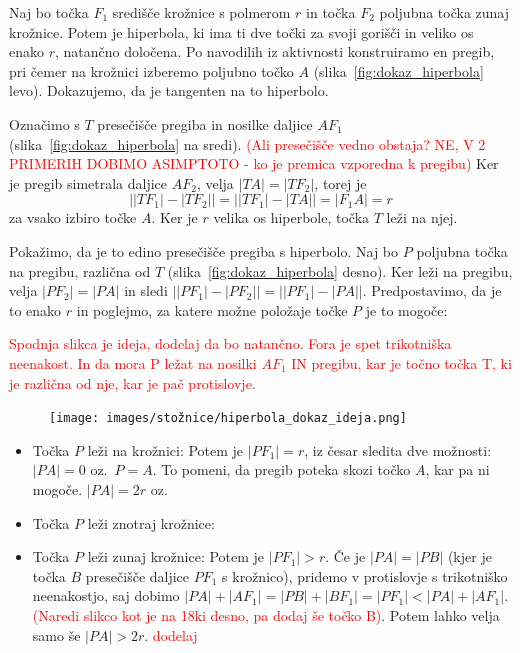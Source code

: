\begin{dokaz}
    Naj bo točka $F_1$ središče krožnice s polmerom $r$ in točka $F_2$ poljubna točka zunaj krožnice. Potem je hiperbola, ki ima ti dve točki za svoji gorišči in veliko os enako $r$, natančno določena. Po navodilih iz aktivnosti konstruiramo en pregib, pri čemer na krožnici izberemo poljubno točko $A$ (slika~\ref{fig:dokaz_hiperbola} levo). Dokazujemo, da je tangenten na to hiperbolo.

    Označimo s $T$ presečišče pregiba in nosilke daljice $AF_1$ (slika~\ref{fig:dokaz_hiperbola} na sredi). \textcolor{red}{(Ali presečišče vedno obstaja? NE, V 2 PRIMERIH DOBIMO ASIMPTOTO - ko je premica vzporedna k pregibu)} Ker je pregib simetrala daljice $AF_2$, velja $|TA| = |TF_2|$, torej je 
    $$\left||TF_1| - |TF_2|\right| = \left||TF_1| - |TA|\right| = |F_1A| = r$$
    za vsako izbiro točke $A$. Ker je $r$ velika os hiperbole, točka $T$ leži na njej.

    Pokažimo, da je to edino presečišče pregiba s hiperbolo. Naj bo $P$ poljubna točka na pregibu, različna od $T$ (slika~\ref{fig:dokaz_hiperbola} desno). Ker leži na pregibu, velja $|PF_2| = |PA|$ in sledi $\left||PF_1| - |PF_2|\right| = \left||PF_1| - |PA|\right|$. Predpostavimo, da je to enako $r$ in poglejmo, za katere možne položaje točke $P$ je to mogoče:

    \textcolor{red}{Spodnja slikca je ideja, dodelaj da bo natančno. Fora je spet trikotniška neenakost. In da mora P ležat na nosilki $AF_1$ IN pregibu, kar je točno točka T, ki je različna od nje, kar je pač protislovje.}

    \begin{figure}[h]
        \centering
        \texttt{[image: images/stožnice/hiperbola\_dokaz\_ideja.png]}
    \end{figure}

    \begin{itemize}
        \item Točka $P$ leži na krožnici: Potem je $|PF_1| = r$, iz česar sledita dve možnosti:
            \subitem $|PA| = 0$ oz.\ $P = A$. To pomeni, da pregib poteka skozi točko $A$, kar pa ni mogoče.
            \subitem $|PA| = 2r$ oz. 
        \item Točka $P$ leži znotraj krožnice: 
        \item Točka $P$ leži zunaj krožnice: Potem je $|PF_1| > r$. Če je $|PA| = |PB|$ (kjer je točka $B$ presečišče daljice $PF_1$ s krožnico), pridemo v protislovje s trikotniško neenakostjo, saj dobimo $|PA| + |AF_1| = |PB| + |BF_1| = |PF_1| < |PA| + |AF_1|$. \textcolor{red}{(Naredi slikco kot je na 18ki desno, pa dodaj še točko B)}. Potem lahko velja samo še $|PA| > 2r$. \textcolor{red}{dodelaj}
    \end{itemize}
    

\end{dokaz}

